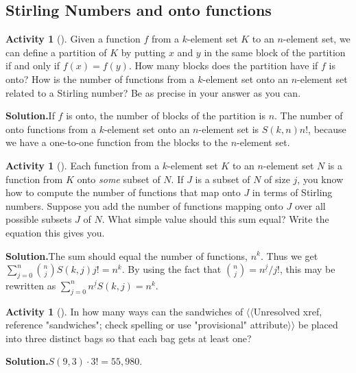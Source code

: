 \documentclass[10pt,]{book}
\theoremstyle{plain}
\theoremstyle{definition}
\newtheorem{activity}[project]{Activity}
\numberwithin{equation}{chapter}
\begin{document}
\subsection[{Stirling Numbers and onto functions}]{Stirling Numbers and onto functions}\label{subsection-11}
\begin{activity}[]\label{activity-38}
Given a function \(f\) from a \(k\)-element set \(K\) to an \(n\)-element set, we can define a partition of \(K\) by putting \(x\) and \(y\) in the same block of the partition if and only if \(f(x)=f(y)\). How many blocks does the partition have if \(f\) is onto? How is the number of functions from a \(k\)-element set onto an \(n\)-element set related to a Stirling number? Be as precise in your answer as you can.%
\par\medskip\noindent%
\textbf{Solution.}\quad If \(f\) is onto, the number of blocks of the partition is \(n\). The number of onto functions from a \(k\)-element set onto an \(n\)-element set is \(S(k,n)n!\), because we have a one-to-one function from the blocks to the \(n\)-element set.%
\end{activity}
\begin{activity}[]\label{Stirlingfalling}
Each function from a \(k\)-element set \(K\) to an \(n\)-element set \(N\) is a function from \(K\) onto \emph{some} subset of \(N\). If \(J\) is a subset of \(N\) of size \(j\), you know how to compute the number of functions that map onto \(J\) in terms of Stirling numbers. Suppose you add the number of functions mapping onto \(J\) over all possible subsets \(J\) of \(N\). What simple value should this sum equal? Write the equation this gives you.%
\par\medskip\noindent%
\textbf{Solution.}\quad The sum should equal the number of functions, \(n^k\). Thus we get \(\sum_{j=0}^n {n\choose j}S(k,j)j! = n^k\). By using the fact that \({n\choose j}= n^{\underline{j}}/j!\), this may be rewritten as \(\sum_{j=0}^n n^{\underline{j}}S(k,j) = n^k.\)%
\end{activity}
\begin{activity}[]\label{activity-40}
In how many ways can the sandwiches of {$\langle\langle$Unresolved xref, reference "sandwiches"; check spelling or use "provisional" attribute$\rangle\rangle$} be placed into three distinct bags so that each bag gets at least one?%
\par\medskip\noindent%
\textbf{Solution.}\quad \(S(9,3)\cdot3!= 55,980\).%
\end{activity}
\end{document}
